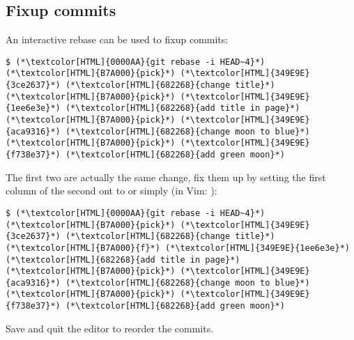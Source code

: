 \subsection{Fixup commits}
\begin{frame}[fragile]
  \subslidetitle
  An interactive rebase can be used to fixup commits:

  \begin{lstlisting}
$ (*\textcolor[HTML]{0000AA}{git rebase -i HEAD~4}*)
(*\textcolor[HTML]{B7A000}{pick}*) (*\textcolor[HTML]{349E9E}{3ce2637}*) (*\textcolor[HTML]{682268}{change title}*)
(*\textcolor[HTML]{B7A000}{pick}*) (*\textcolor[HTML]{349E9E}{1ee6e3e}*) (*\textcolor[HTML]{682268}{add title in page}*)
(*\textcolor[HTML]{B7A000}{pick}*) (*\textcolor[HTML]{349E9E}{aca9316}*) (*\textcolor[HTML]{682268}{change moon to blue}*)
(*\textcolor[HTML]{B7A000}{pick}*) (*\textcolor[HTML]{349E9E}{f738e37}*) (*\textcolor[HTML]{682268}{add green moon}*)
\end{lstlisting}

  The first two are actually the same change, fix them up by setting the first
  column of the second ont to  or simply  (in Vim: ):

  \begin{lstlisting}
$ (*\textcolor[HTML]{0000AA}{git rebase -i HEAD~4}*)
(*\textcolor[HTML]{B7A000}{pick}*) (*\textcolor[HTML]{349E9E}{3ce2637}*) (*\textcolor[HTML]{682268}{change title}*)
(*\textcolor[HTML]{B7A000}{f}*) (*\textcolor[HTML]{349E9E}{1ee6e3e}*) (*\textcolor[HTML]{682268}{add title in page}*)
(*\textcolor[HTML]{B7A000}{pick}*) (*\textcolor[HTML]{349E9E}{aca9316}*) (*\textcolor[HTML]{682268}{change moon to blue}*)
(*\textcolor[HTML]{B7A000}{pick}*) (*\textcolor[HTML]{349E9E}{f738e37}*) (*\textcolor[HTML]{682268}{add green moon}*)
\end{lstlisting}

  Save and quit the editor to reorder the commits.
\end{frame}




